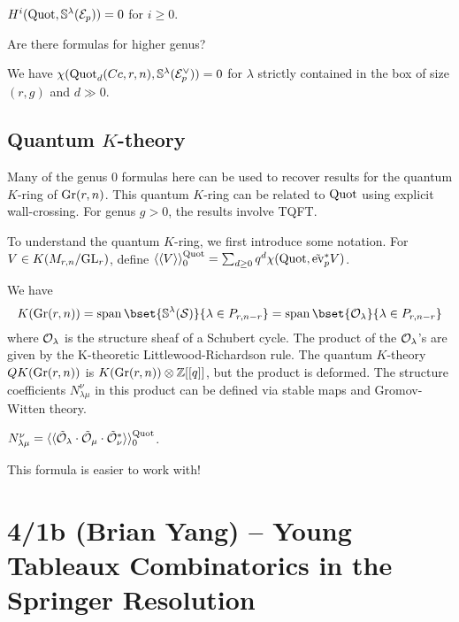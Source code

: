 \documentclass{article}
\begin{document}
\begin{conj}
	$H^i(\operatorname{Quot}, \mathbb{S}^\lambda(\mathcal{E}_p)) = 0$ for $i \geq 0$.
\end{conj}

\begin{qn}
	Are there formulas for higher genus?
\end{qn}

\begin{ex}
	We have $\chi(\operatorname{Quot}_d(Cc, r, n), \mathbb{S}^\lambda(\mathcal{E}_p^\vee)) = 0$ for $\lambda$ strictly contained in the box of size $(r, g)$ and $d \gg 0$.
\end{ex}

\subsection{Quantum $K$-theory}

Many of the genus $0$ formulas here can be used to recover results for the quantum $K$-ring of $\operatorname{Gr}(r, n)$.
This quantum $K$-ring can be related to $\operatorname{Quot}$ using explicit wall-crossing.
For genus $g > 0$, the results involve TQFT.

To understand the quantum $K$-ring, we first introduce some notation.
For $V \in K(M_{r,n} / \mathrm{GL}_r)$, define $\langle {\langle {V} \rangle} \rangle_0^{\operatorname{Quot}} = \sum_{d \geq 0} q^d \chi(\operatorname{Quot}, \tilde{\operatorname{ev}}_p^* V)$.

We have 
\[
	K(\Gr(r,n)) = \spanop \bset{\SS^\lambda(\Sc)}{\lambda \in P_{r,n-r}} = \spanop \bset{\Oc_\lambda}{\lambda \in P_{r,n-r}}
\]
where $\mathcal{O}_\lambda$ is the structure sheaf of a Schubert cycle.
The product of the $\mathcal{O}_\lambda$'s are given by the K-theoretic Littlewood-Richardson rule.
The quantum $K$-theory $QK(\operatorname{Gr}(r, n))$ is $K(\operatorname{Gr}(r, n)) \otimes \mathbb{Z}[[q]]$, but the product is deformed.
The structure coefficients $N_{\lambda\mu}^\nu$ in this product can be defined via stable maps and Gromov-Witten theory.

\begin{thm}
  $N_{\lambda\mu}^\nu = \langle {\langle {\tilde{\mathcal{O}}_\lambda \cdot \tilde{\mathcal{O}}_\mu \cdot \tilde{\mathcal{O}}_\nu^*} \rangle} \rangle_0^{\operatorname{Quot}}$.
\end{thm}

This formula is easier to work with!

\section{4/1b (Brian Yang) -- Young Tableaux Combinatorics in the Springer Resolution}
\end{document}
